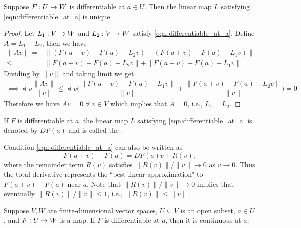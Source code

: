 \documentclass[11pt,a4paper]{article}
\begin{document}
\begin{proposition}
Suppose $F:U\rightarrow W$ is differentiable at $a\in U$. Then the linear map $L$ satisfying \eqref{eqn:differentiable_at_a} is unique.
\end{proposition}

\begin{proof}
Let $L_1:V\rightarrow W$ and $L_2:V\rightarrow W$ satisfy \eqref{eqn:differentiable_at_a}. Define $A = L_1-L_2$, then we have
\begin{eqnarray*}
\|Av\| 
=& \|(F(a+v)-F(a)-L_2v) - (F(a+v)-F(a)-L_1v)\| \\
\le& \|F(a+v)-F(a)-L_2v\| + \|F(a+v)-F(a)-L_1v\|
\end{eqnarray*}
Dividing by $\|v\|$ and taking limit we get
\begin{eqnarray*}
\implies 
\Lt{v} \dfrac{\|Av\|}{\|v\|} 
\le \Lt{v} \bigg( \dfrac{\|F(a+v)-F(a)-L_1v\|}{\|v\|} + \dfrac{\|F(a+v)-F(a)-L_2v\|}{\|v\|} \bigg) = 0 
\end{eqnarray*}
Therefore we have $Av = 0\; \forall\; v\in V$ which implies that $A = 0$, i.e., $L_1 = L_2$.
\end{proof}

\begin{definition}
If $F$ is differentiable at $a$, the linear map $L$ satisfying \eqref{eqn:differentiable_at_a} is denoted by $DF(a)$ and is called the . 
\end{definition}

\begin{remark}\label{remark:remainder_form}
Condition \eqref{eqn:differentiable_at_a} can also be written as 
\begin{equation}\label{eqn:remainder_form}
    F(a+v)-F(a) = DF(a)v+R(v),
\end{equation}
where the remainder term $R(v)$ satisfies $\|R(v)\|/\|v\|\rightarrow 0$ as $v\rightarrow 0$. Thus the total derivative represents the ``best linear approximation" to $F(a+v)-F(a)$ near $a$. Note that $\|R(v)\|/\|v\|\rightarrow 0$ implies that eventually $\|R(v)\|/\|v\|\le 1$, i.e., $\|R(v)\|\le \|v\|$.
\end{remark}

\begin{proposition}
Suppose $V,W$ are finite-dimensional vector spaces, $U\subseteq V$ is an open subset, $a\in U$, and $F:U\rightarrow W$ is a map. If $F$ is differentiable at $a$, then it is continuous at $a$.
\end{proposition}
\end{document}
